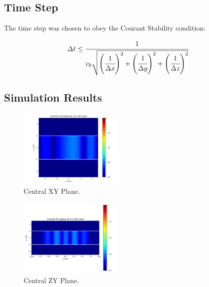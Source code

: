\subsection{Time Step}

The time step was chosen to obey the Courant Stability condition:

\begin{equation}
    \dt \leq \cfrac{1}{c_0\sqrt{\pare{\cfrac{1}{\dx}}^2 + \pare{\cfrac{1}{\dy}}^2 + \pare{\cfrac{1}{\dz}}^2}}
\end{equation}

\subsection{Simulation Results}

\begin{figure}[H]
    \centering
    \includegraphics[width=0.45\textwidth]{contents/central_xy_plane.png}
    \caption{Central XY Plane.}
\end{figure}

\begin{figure}[H]
    \centering
    \includegraphics[width=0.45\textwidth]{contents/central_zy_plane.png}
    \caption{Central ZY Plane.}
\end{figure}